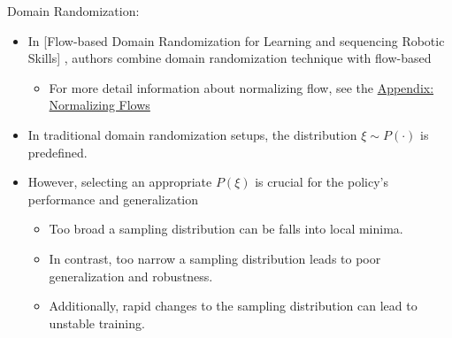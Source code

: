\documentclass{beamer}
\begin{document}
\begin{frame}{Domain Randomization: \cite{curtisFlowbasedDomainRandomization2025a}}
    \begin{itemize}
        \item In [Flow-based Domain Randomization for Learning and sequencing Robotic Skills] \cite{curtisFlowbasedDomainRandomization2025a}, authors combine domain randomization technique with flow-based
        \begin{itemize}
            \item For more detail information about normalizing flow, see the \hyperlink{norm_flow}{Appendix: Normalizing Flows}
        \end{itemize}
        \item In traditional domain randomization setups, the distribution $\xi \sim P(\cdot)$ is predefined.
        \item However, selecting an appropriate $P(\xi)$ is crucial for the policy's performance and generalization
        \begin{itemize}
            \item Too broad a sampling distribution can be falls into local minima.
            \item In contrast, too narrow a sampling distribution leads to poor generalization and robustness.
            \item Additionally, rapid changes to the sampling distribution can lead to unstable training.
        \end{itemize}
    \end{itemize}
\end{frame}
\end{document}
